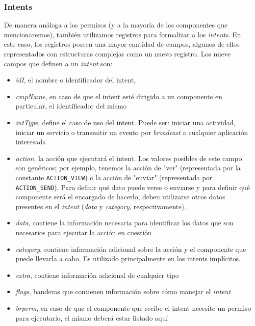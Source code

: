 \subsubsection*{Intents}
De manera análoga a los permisos (y a la mayoría de los componentes que mencionaremos), también
utilizamos registros para formalizar a los \textit{intents}. En este caso, los registros poseen una mayor
cantidad de campos, algunos de ellos representados con estructuras complejas como un nuevo registro. Los
nueve campos que definen a un \textit{intent} son:

\begin{itemize}
    \item \textit{idI}, el nombre o identificador del intent,
    \item \textit{cmpName}, en caso de que el intent esté dirigido a un componente en particular, el
          identificador del mismo
    \item \textit{intType}, define el caso de uso del intent. Puede ser: iniciar una actividad, iniciar
          un servicio o transmitir un evento por \textit{broadcast} a cualquier aplicación interesada
    \item \textit{action}, la acción que ejecutará el intent. Los valores posibles de este campo son
          genéricos; por ejemplo, tenemos la acción de "ver" (representada por la constante
          \texttt{ACTION\_VIEW}) o la acción de "enviar" (representada por \texttt{ACTION\_SEND}). Para definir
          qué dato puede verse o enviarse y para definir qué componente será el encargado de hacerlo, deben
          utilizarse otros datos presentes en el \textit{intent} (\textit{data} y \textit{category},
          respectivamente).
    \item \textit{data}, contiene la información necesaria para identificar los datos que son necesarios
          para ejecutar la acción en cuestión
    \item \textit{category}, contiene información adicional sobre la acción y el componente que puede
          llevarla a cabo. Es utilizado principalmente en los intents implícitos.
    \item \textit{extra}, contiene información adicional de cualquier tipo
    \item \textit{flags}, banderas que contienen información sobre cómo manejar el \textit{intent}
    \item\textit{brperm}, en caso de que el componente que recibe el intent necesite un permiso para
          ejecutarlo, el mismo deberá estar listado aquí
\end{itemize}


